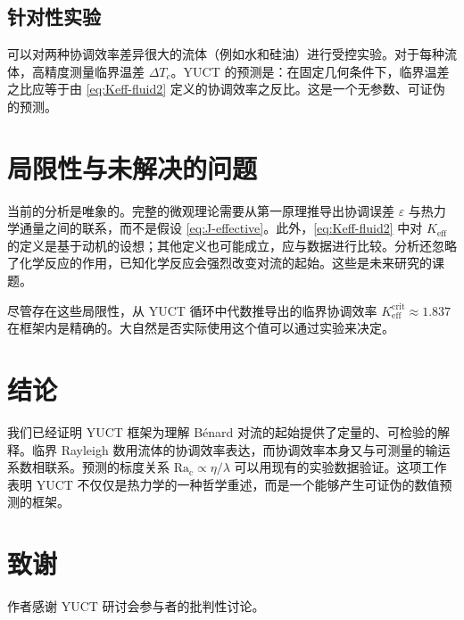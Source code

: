 \documentclass[12pt,a4paper]{article}
\begin{document}
	\subsection{针对性实验}
	可以对两种协调效率差异很大的流体（例如水和硅油）进行受控实验。对于每种流体，高精度测量临界温差 \(\Delta T_c\)。YUCT 的预测是：在固定几何条件下，临界温差之比应等于由 \eqref{eq:Keff-fluid2} 定义的协调效率之反比。这是一个无参数、可证伪的预测。
	
	\section{局限性与未解决的问题}
	
	当前的分析是唯象的。完整的微观理论需要从第一原理推导出协调误差 \(\varepsilon\) 与热力学通量之间的联系，而不是假设 \eqref{eq:J-effective}。此外，\eqref{eq:Keff-fluid2} 中对 \(K_{\mathrm{eff}}\) 的定义是基于动机的设想；其他定义也可能成立，应与数据进行比较。分析还忽略了化学反应的作用，已知化学反应会强烈改变对流的起始。这些是未来研究的课题。
	
	尽管存在这些局限性，从 YUCT 循环中代数推导出的临界协调效率 \(K_{\mathrm{eff}}^{\mathrm{crit}} \approx 1.837\) 在框架内是精确的。大自然是否实际使用这个值可以通过实验来决定。
	
	\section{结论}
	
	我们已经证明 YUCT 框架为理解 B\'{e}nard 对流的起始提供了定量的、可检验的解释。临界 Rayleigh 数用流体的协调效率表达，而协调效率本身又与可测量的输运系数相联系。预测的标度关系 \(\mathrm{Ra_c} \propto \eta/\lambda\) 可以用现有的实验数据验证。这项工作表明 YUCT 不仅仅是热力学的一种哲学重述，而是一个能够产生可证伪的数值预测的框架。
	
	\section*{致谢}
	作者感谢 YUCT 研讨会参与者的批判性讨论。
	
\end{document}
